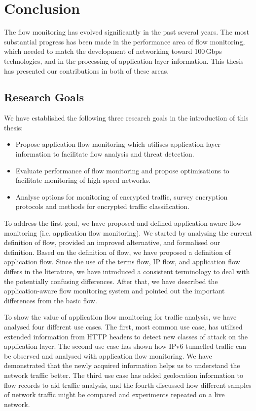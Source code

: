 \chapter{Conclusion}\label{chap:conclusions}

The flow monitoring has evolved significantly in the past several years. The most substantial progress has been made in the performance area of flow monitoring, which needed to match the development of networking toward 100\,Gbps technologies, and in the processing of application layer information. This thesis has presented our contributions in both of these areas. 

\section{Research Goals}

We have established the following three research goals in the introduction of this thesis:
\begin{itemize}
  \item Propose application flow monitoring which utilises application layer information to facilitate flow analysis and threat detection.
  \item Evaluate performance of flow monitoring and propose optimisations to facilitate monitoring of high-speed networks.
  \item Analyse options for monitoring of encrypted traffic, survey encryption protocols and methods for encrypted traffic classification.
\end{itemize}

To address the first goal, we have proposed and defined application-aware flow monitoring (i.e. application flow monitoring). We started by analysing the current definition of flow, provided an improved alternative, and formalised our definition. Based on the definition of flow, we have proposed a definition of application flow. Since the use of the terms flow, IP flow, and application flow differs in the literature, we have introduced a consistent terminology to deal with the potentially confusing differences. After that, we have described the application-aware flow monitoring system and pointed out the important differences from the basic flow. 

To show the value of application flow monitoring for traffic analysis, we have analysed four different use cases. The first, most common use case, has utilised extended information from HTTP headers to detect new classes of attack on the application layer. The second use case has shown how IPv6 tunnelled traffic can be observed and analysed with application flow monitoring. We have demonstrated that the newly acquired information helps us to understand the network traffic better. The third use case has added geolocation information to flow records to aid traffic analysis, and the fourth discussed how different samples of network traffic might be compared and experiments repeated on a live network.

